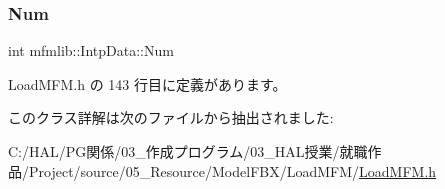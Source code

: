 \subsubsection{\texorpdfstring{Num}{Num}}
{\footnotesize\ttfamily int mfmlib\+::\+Intp\+Data\+::\+Num}



 Load\+M\+F\+M.\+h の 143 行目に定義があります。



このクラス詳解は次のファイルから抽出されました\+:\begin{DoxyCompactItemize}
\item 
C\+:/\+H\+A\+L/\+P\+G関係/03\+\_\+作成プログラム/03\+\_\+\+H\+A\+L授業/就職作品/\+Project/source/05\+\_\+\+Resource/\+Model\+F\+B\+X/\+Load\+M\+F\+M/\mbox{\hyperlink{_load_m_f_m_8h}{Load\+M\+F\+M.\+h}}\end{DoxyCompactItemize}
